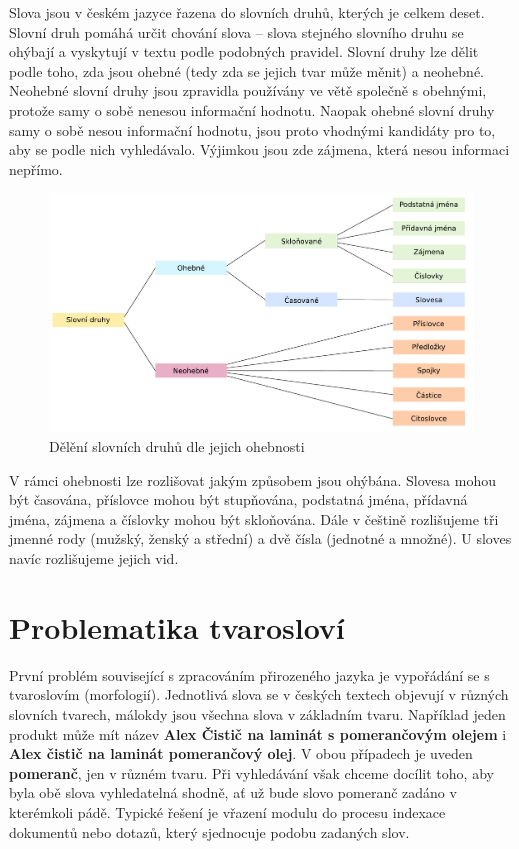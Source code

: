 \documentclass[FM,DP]{tulthesis}
\begin{document}
Slova jsou v českém jazyce řazena do slovních druhů, kterých je celkem deset.
Slovní druh pomáhá určit chování slova -- slova stejného slovního druhu se ohýbají
a vyskytují v textu podle podobných pravidel. Slovní druhy lze dělit podle
toho, zda jsou ohebné (tedy zda se jejich tvar může měnit) a neohebné.
Neohebné slovní druhy jsou zpravidla používány ve větě společně s obehnými, 
protože samy o sobě nenesou informační hodnotu. Naopak ohebné slovní druhy
samy o sobě nesou informační hodnotu, jsou proto vhodnými kandidáty pro
to, aby se podle nich vyhledávalo. Výjimkou jsou zde zájmena, která nesou 
informaci nepřímo.

\begin{figure}[h]
\center
\includegraphics[width=\textwidth]{slovni-druhy.pdf}
\caption{Dělění slovních druhů dle jejich ohebnosti}
\label{slovni-druhy}
\end{figure}

V rámci ohebnosti lze rozlišovat jakým způsobem jsou ohýbána. Slovesa mohou být
časována, příslovce mohou být stupňována, podstatná jména, přídavná jména, zájmena
a číslovky mohou být skloňována. Dále v češtině rozlišujeme tři jmenné rody
(mužský, ženský a střední) a dvě čísla (jednotné a množné). U sloves navíc 
rozlišujeme jejich vid.

\section{Problematika tvarosloví}

První problém související s zpracováním přirozeného jazyka je vypořádání se s tvaroslovím
(morfologií). Jednotlivá slova se v českých textech objevují v různých slovních tvarech, 
málokdy jsou všechna slova v základním tvaru. Například jeden produkt může mít název
\textbf{Alex Čistič na laminát s pomerančovým olejem} i \textbf{Alex čistič na laminát pomerančový olej}.
V obou případech je uveden \textbf{pomeranč}, jen v různém tvaru. Při vyhledávání však
chceme docílit toho, aby byla obě slova vyhledatelná shodně, ať už bude slovo pomeranč
zadáno v kterémkoli pádě. Typické řešení je vřazení modulu do procesu indexace dokumentů nebo 
dotazů, který sjednocuje podobu zadaných slov.
\end{document}

